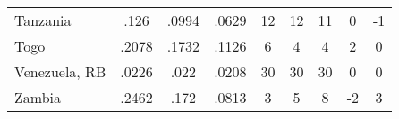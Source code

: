 {\begin{tabular}{l*{1}{cccccccc}}
Tanzania                      &        .126&       .0994&       .0629&          12&          12&          11&           0&          -1\\
Togo                          &       .2078&       .1732&       .1126&           6&           4&           4&           2&           0\\
Venezuela, RB                 &       .0226&        .022&       .0208&          30&          30&          30&           0&           0\\
Zambia                        &       .2462&        .172&       .0813&           3&           5&           8&          -2&           3\\
\hline\hline
\end{tabular}
}
